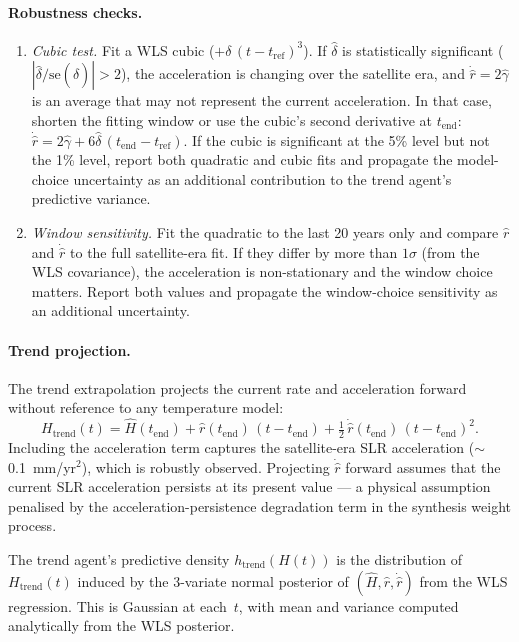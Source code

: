 \documentclass[11pt]{article}
\newcommand{\tend}{t_{\mathrm{end}}}
\begin{document}
\paragraph{Robustness checks.}
\begin{enumerate}
  \item \textit{Cubic test.}  Fit a WLS cubic ($+ \delta\,(t - t_{\mathrm{ref}})^3$).  If $\hat\delta$ is statistically significant ($|\hat\delta / \mathrm{se}(\hat\delta)| > 2$), the acceleration is changing over the satellite era, and $\dot{\hat{r}} = 2\hat\gamma$ is an average that may not represent the current acceleration.  In that case, shorten the fitting window or use the cubic's second derivative at $\tend$: $\dot{\hat{r}} = 2\hat\gamma + 6\hat\delta\,(\tend - t_{\mathrm{ref}})$.  If the cubic is significant at the 5\% level but not the 1\% level, report both quadratic and cubic fits and propagate the model-choice uncertainty as an additional contribution to the trend agent's predictive variance.
  \item \textit{Window sensitivity.}  Fit the quadratic to the last 20 years only and compare $\hat{r}$ and $\dot{\hat{r}}$ to the full satellite-era fit.  If they differ by more than $1\sigma$ (from the WLS covariance), the acceleration is non-stationary and the window choice matters.  Report both values and propagate the window-choice sensitivity as an additional uncertainty.
\end{enumerate}

\paragraph{Trend projection.}  The trend extrapolation projects the current rate and acceleration forward without reference to any temperature model:
\begin{equation}
  H_{\mathrm{trend}}(t) = \hat{H}(\tend) + \hat{r}(\tend)\,(t - \tend) + \tfrac{1}{2}\,\dot{\hat{r}}(\tend)\,(t - \tend)^2.
  \label{eq:trend_projection}
\end{equation}
Including the acceleration term captures the satellite-era SLR acceleration ($\sim$0.1~mm/yr$^2$), which is robustly observed.  Projecting $\dot{\hat{r}}$ forward assumes that the current SLR acceleration persists at its present value --- a physical assumption penalised by the acceleration-persistence degradation term in the synthesis weight process.

The trend agent's predictive density $h_{\mathrm{trend}}(H(t))$ is the distribution of $H_{\mathrm{trend}}(t)$ induced by the 3-variate normal posterior of $(\hat{H}, \hat{r}, \dot{\hat{r}})$ from the WLS regression.  This is Gaussian at each~$t$, with mean and variance computed analytically from the WLS posterior.
\end{document}
